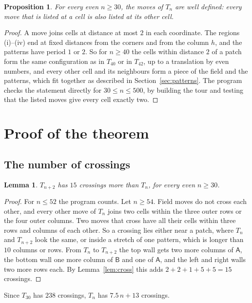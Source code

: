 \documentclass[11pt]{amsart}
\newtheorem{lemma}[theorem]{Lemma}
\newtheorem{proposition}[theorem]{Proposition}
\theoremstyle{remark}
\begin{document}
\begin{proposition}\label{prop:cover}
For every even $n\ge30$, the moves of $T_n$ are well defined: every move that is listed at a cell is also listed at
its other cell.
\end{proposition}
\begin{proof}
A move joins cells at distance at most $2$ in each coordinate. The regions (i)--(iv) end at fixed distances from the
corners and from the column $h$, and the patterns have period $1$ or $2$. So for $n\ge40$ the cells within distance
$2$ of a patch form the same configuration as in $T_{40}$ or in $T_{42}$, up to a translation by even numbers, and
every other cell and its neighbours form a piece of the field and the patterns, which fit together as described in
Section~\ref{sec:patterns}. The program checks the statement directly for $30\le n\le500$, by building the tour and
testing that the listed moves give every cell exactly two.
\end{proof}

\section{Proof of the theorem}\label{sec:proof}
\subsection*{The number of crossings}
\begin{lemma}\label{lem:count}
$T_{n+2}$ has $15$ crossings more than $T_n$, for every even $n\ge30$.
\end{lemma}
\begin{proof}
For $n\le52$ the program counts. Let $n\ge54$. Field moves do not cross each other, and every other move of $T_n$
joins two cells within the three outer rows or the four outer columns. Two moves that cross have all their cells
within three rows and columns of each other. So a crossing lies either near a patch, where $T_n$ and $T_{n+2}$
look the same, or inside a stretch of one pattern, which is longer than $10$ columns or rows. From $T_n$ to
$T_{n+2}$ the top wall gets two more columns of $\mathsf A$, the bottom wall one more column of $\mathsf B$ and one
of $\mathsf A$, and the left and right walls two more rows each. By Lemma~\ref{lem:cross} this adds $2+2+1+5+5=15$
crossings.
\end{proof}
Since $T_{30}$ has $238$ crossings, $T_n$ has $7.5\,n+13$ crossings.
\end{document}
